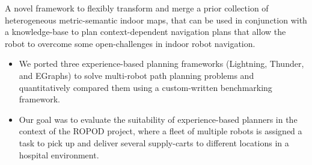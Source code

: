 \documentclass[10pt,a4paper,ragged2e]{altacv}
\begin{document}


A novel framework to flexibly transform and merge a prior collection of heterogeneous metric-semantic indoor maps, that can be used in conjunction with a knowledge-base to plan context-dependent navigation plans that allow the robot to overcome some open-challenges in indoor robot navigation.


\divider


\begin{itemize}
	\item We ported three experience-based planning frameworks (Lightning, Thunder, and EGraphs) to solve multi-robot path planning problems and quantitatively compared them using a custom-written benchmarking framework. 
	\item Our goal was to evaluate the suitability of experience-based planners in the context of the ROPOD project, where a fleet of multiple robots is assigned a task to pick up and deliver several supply-carts to different locations in a hospital environment.
\end{itemize}

\divider

\end{document}
